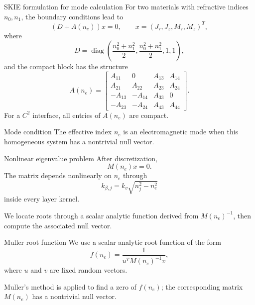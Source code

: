\documentclass[aspectratio=169,10pt]{beamer}
\DeclareMathOperator{\diag}{diag}
\begin{document}
\begin{frame}{SKIE formulation for mode calculation}
\scriptsize
For two materials with refractive indices $n_0,n_1$, the boundary
conditions lead to
\[
  (D+A(n_e))x=0,
  \qquad x=(J_\tau,J_z,M_\tau,M_z)^T,
\]
where
\[
  D=\diag\left(
  \frac{n_0^2+n_1^2}{2},
  \frac{n_0^2+n_1^2}{2},
  1,
  1
  \right),
\]
and the compact block has the structure
\[
A(n_e)=\begin{bmatrix}
A_{11}&0&A_{13}&A_{14}\\
A_{21}&A_{22}&A_{23}&A_{24}\\
-A_{13}&-A_{14}&A_{33}&0\\
-A_{23}&-A_{24}&A_{43}&A_{44}
\end{bmatrix}.
\]
For a $C^2$ interface, all entries of $A(n_e)$ are compact.

\begin{block}{Mode condition}
The effective index $n_e$ is an electromagnetic mode when this homogeneous
system has a nontrivial null vector.
\end{block}
\end{frame}

\begin{frame}{Nonlinear eigenvalue problem}
\small
After discretization,
\[
  M(n_e)x=0.
\]
The matrix depends nonlinearly on $n_e$ through
\[
  k_{\beta,j}=k_v\sqrt{n_j^2-n_e^2}
\]
inside every layer kernel.

We locate roots through a scalar analytic function derived from
$M(n_e)^{-1}$, then compute the associated null vector.
\end{frame}

\begin{frame}{Muller root function}
\small
We use a scalar analytic root function of the form
\[
  f(n_e)=\frac{1}{u^T M(n_e)^{-1}v},
\]
where $u$ and $v$ are fixed random vectors.

Muller's method is applied to find a zero of $f(n_e)$; the corresponding
matrix $M(n_e)$ has a nontrivial null vector.

\end{frame}
\end{document}
